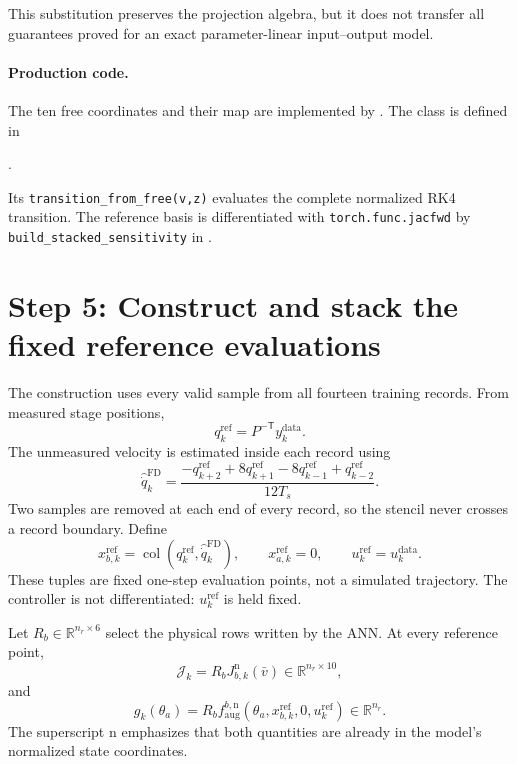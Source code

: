 \documentclass[11pt,a4paper]{article}
\newcommand{\R}{\mathbb{R}}
\newcommand{\col}{\operatorname{col}}
\newcommand{\T}{\mathsf{T}}
\newcommand{\code}[1]{\texttt{#1}}
\begin{document}
This substitution preserves the projection algebra, but it does not transfer
all guarantees proved for an exact parameter-linear input--output model.

\paragraph{Production code.}
The ten free coordinates and their map are implemented by
.  The class is defined in
\begin{center}
\small{}.
\end{center}
Its
\code{transition\_from\_free(v,z)} evaluates the complete normalized RK4
transition.  The reference basis is differentiated with
\code{torch.func.jacfwd} by \code{build\_stacked\_sensitivity} in
.

\clearpage
\section{Step 5: Construct and stack the fixed reference evaluations}

The construction uses every valid sample from all fourteen training records.
From measured stage positions,
\begin{equation}
q_k^{\mathrm{ref}}=P^{-\T}y_k^{\mathrm{data}}.
\end{equation}
The unmeasured velocity is estimated inside each record using
\begin{equation}
\widehat{\dot q}_k^{\mathrm{FD}}
=\frac{-q_{k+2}^{\mathrm{ref}}+8q_{k+1}^{\mathrm{ref}}
-8q_{k-1}^{\mathrm{ref}}+q_{k-2}^{\mathrm{ref}}}{12T_s}.
\label{eq:fd}
\end{equation}
Two samples are removed at each end of every record, so the stencil never
crosses a record boundary.  Define
\begin{equation}
x_{b,k}^{\mathrm{ref}}
=\col(q_k^{\mathrm{ref}},\widehat{\dot q}_k^{\mathrm{FD}}),
\qquad
x_{a,k}^{\mathrm{ref}}=0,
\qquad
u_k^{\mathrm{ref}}=u_k^{\mathrm{data}}.
\end{equation}
These tuples are fixed one-step evaluation points, not a simulated trajectory.
The controller is not differentiated: \(u_k^{\mathrm{ref}}\) is held fixed.

Let \(R_b\in\R^{n_r\times6}\) select the physical rows written by the ANN.
At every reference point,
\begin{equation}
\mathcal J_k
=R_bJ_{b,k}^{\mathrm n}(\bar v)
\in\R^{n_r\times10},
\end{equation}
and
\begin{equation}
g_k(\theta_a)
=R_b f_{\mathrm{aug}}^{b,\mathrm n}
(\theta_a,x_{b,k}^{\mathrm{ref}},0,u_k^{\mathrm{ref}})
\in\R^{n_r}.
\end{equation}
The superscript \({\mathrm n}\) emphasizes that both quantities are already
in the model's normalized state coordinates.
\end{document}
